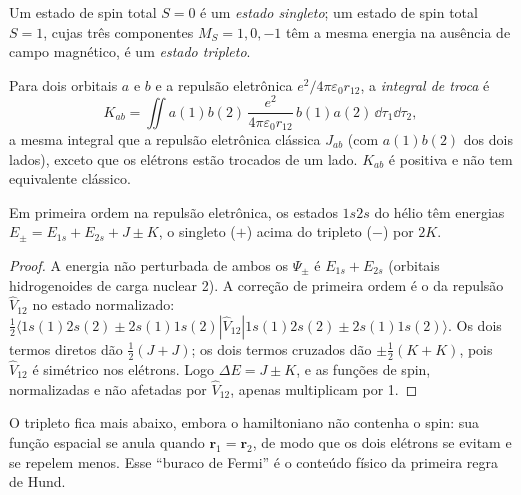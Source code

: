 \begin{definition}\label{def:b3:many-electron-atoms:singlet-triplet}
Um estado de spin total $S = 0$ é um \emph{estado singleto};
um estado de spin total $S = 1$, cujas três componentes $M_S = 1, 0, -1$ têm a
mesma energia na ausência de campo magnético, é um \emph{estado
tripleto}.
\end{definition}

\begin{definition}\label{def:b3:many-electron-atoms:exchange}
Para dois orbitais $a$ e $b$ e a repulsão eletrônica $e^2/4\pi\varepsilon_0
r_{12}$, a \emph{integral de troca} é
\[
K_{ab} = \iint a(1)b(2)\,\frac{e^2}{4\pi\varepsilon_0r_{12}}\,b(1)a(2)\,\dd\tau_1\dd\tau_2,
\]
a mesma integral que a repulsão eletrônica clássica $J_{ab}$ (com
$a(1)b(2)$ dos dois lados), exceto que os elétrons estão trocados de um
lado. $K_{ab}$ é positiva e não tem equivalente clássico.
\end{definition}

\begin{proposition}\label{prop:b3:many-electron-atoms:helium}
Em primeira ordem na repulsão eletrônica, os estados $1s2s$ do hélio têm
energias $E_\pm = E_{1s} + E_{2s} + J \pm K$, o singleto ($+$) acima do
tripleto ($-$) por $2K$.
\end{proposition}

\begin{proof}
A energia não perturbada de ambos os $\Psi_\pm$ é $E_{1s} + E_{2s}$ (orbitais
hidrogenoides de carga nuclear 2). A correção de primeira ordem é o  da repulsão $\hat V_{12}$ no estado normalizado:
$\frac12\langle 1s(1)2s(2) \pm 2s(1)1s(2)|\hat V_{12}|1s(1)2s(2) \pm
2s(1)1s(2)\rangle$. Os dois termos diretos dão $\frac12(J + J)$; os dois termos
cruzados dão $\pm\frac12(K + K)$, pois $\hat V_{12}$ é simétrico nos
elétrons. Logo $\Delta E = J \pm K$, e as funções de spin, normalizadas e
não afetadas por $\hat V_{12}$, apenas multiplicam por 1.
\end{proof}

O tripleto fica mais abaixo, embora o hamiltoniano não contenha o spin: sua
função espacial se anula quando $\mathbf r_1 = \mathbf r_2$, de modo que os
dois elétrons se evitam e se repelem menos. Esse ``buraco de Fermi'' é o
conteúdo físico da primeira regra de Hund.

